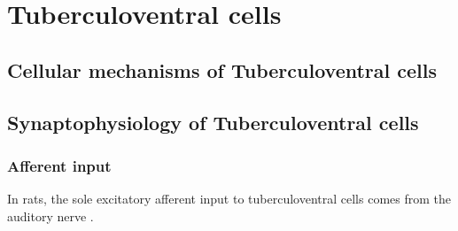 \section{Tuberculoventral cells}



\subsection{Cellular mechanisms of Tuberculoventral cells}

\subsection{Synaptophysiology of Tuberculoventral cells}

\subsubsection{Afferent input}

In rats, the sole excitatory afferent input to tuberculoventral cells comes from the auditory nerve \citep{RubioJuiz:2004}.


\citep{RubioJuiz:2004}


